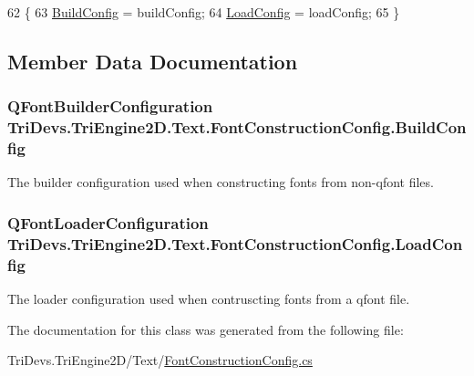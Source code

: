 \begin{DoxyCode}
62         \{
63             \hyperlink{class_tri_devs_1_1_tri_engine2_d_1_1_text_1_1_font_construction_config_ac011795d83d039d7d4591d65520160ab}{BuildConfig} = buildConfig;
64             \hyperlink{class_tri_devs_1_1_tri_engine2_d_1_1_text_1_1_font_construction_config_a0e97efb5b18aa8c15c895b51ee4c5b65}{LoadConfig} = loadConfig;
65         \}
\end{DoxyCode}


\subsection{Member Data Documentation}
\hypertarget{class_tri_devs_1_1_tri_engine2_d_1_1_text_1_1_font_construction_config_ac011795d83d039d7d4591d65520160ab}{
\subsubsection[{Build\-Config}]{\setlength{\rightskip}{0pt plus 5cm}Q\-Font\-Builder\-Configuration Tri\-Devs.\-Tri\-Engine2\-D.\-Text.\-Font\-Construction\-Config.\-Build\-Config}}\label{class_tri_devs_1_1_tri_engine2_d_1_1_text_1_1_font_construction_config_ac011795d83d039d7d4591d65520160ab}


The builder configuration used when constructing fonts from non-\/qfont files. 

\hypertarget{class_tri_devs_1_1_tri_engine2_d_1_1_text_1_1_font_construction_config_a0e97efb5b18aa8c15c895b51ee4c5b65}{
\subsubsection[{Load\-Config}]{\setlength{\rightskip}{0pt plus 5cm}Q\-Font\-Loader\-Configuration Tri\-Devs.\-Tri\-Engine2\-D.\-Text.\-Font\-Construction\-Config.\-Load\-Config}}\label{class_tri_devs_1_1_tri_engine2_d_1_1_text_1_1_font_construction_config_a0e97efb5b18aa8c15c895b51ee4c5b65}


The loader configuration used when contruscting fonts from a qfont file. 



The documentation for this class was generated from the following file\-:\begin{DoxyCompactItemize}
\item 
Tri\-Devs.\-Tri\-Engine2\-D/\-Text/\hyperlink{_font_construction_config_8cs}{Font\-Construction\-Config.\-cs}\end{DoxyCompactItemize}
